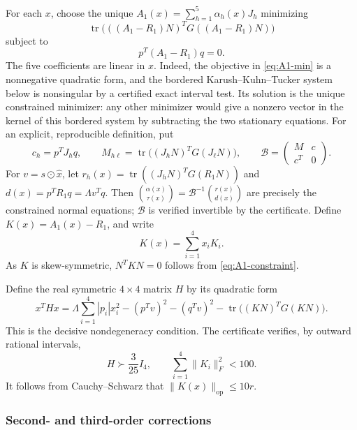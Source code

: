\documentclass[11pt]{article}
\newcommand{\tr}{\operatorname{tr}}
\newcommand{\Op}{\mathrm{op}}
\begin{document}
For each $x$, choose the unique $A_1(x)=\sum_{h=1}^5\alpha_h(x)J_h$ minimizing
\begin{equation}\label{eq:A1-min}
 \tr\bigl(((A_1-R_1)N)^TG((A_1-R_1)N)\bigr)
\end{equation}
subject to
\begin{equation}\label{eq:A1-constraint}
 p^T(A_1-R_1)q=0.
\end{equation}
The five coefficients are linear in $x$. Indeed, the objective in
\eqref{eq:A1-min} is a nonnegative quadratic form, and the bordered
Karush--Kuhn--Tucker system below is nonsingular by a certified exact
interval test. Its solution is the unique constrained minimizer: any other
minimizer would give a nonzero vector in the kernel of this bordered system
by subtracting the two stationary equations. For an explicit, reproducible
definition, put
\begin{equation}\label{eq:M-c}
 c_h=p^TJ_hq,\qquad
 M_{h\ell}=\tr\bigl((J_hN)^TG(J_\ell N)\bigr),\qquad
 \mathcal B=\begin{pmatrix}M&c\\c^T&0\end{pmatrix}.
\end{equation}
For $v=s\odot\widehat x$, let $r_h(x)=\tr((J_hN)^TG(R_1N))$ and $d(x)=p^TR_1q=\Lambda v^Tq$. Then $\binom{\alpha(x)}{\tau(x)}=\mathcal B^{-1}\binom{r(x)}{d(x)}$ are precisely the constrained normal equations; $\mathcal B$ is verified invertible by the certificate. Define $K(x)=A_1(x)-R_1$, and write
\begin{equation}\label{eq:Ki}
 K(x)=\sum_{i=1}^4x_iK_i.
\end{equation}
As $K$ is skew-symmetric, $N^TKN=0$ follows from \eqref{eq:A1-constraint}.

Define the real symmetric $4\times4$ matrix $H$ by its quadratic form
\begin{equation}\label{eq:H}
 x^THx=\Lambda\sum_{i=1}^4|p_i|x_i^2
 -(p^Tv)^2-(q^Tv)^2
 -\tr\bigl((KN)^TG(KN)\bigr).
\end{equation}
This is the decisive nondegeneracy condition. The certificate verifies, by outward rational intervals,
\begin{equation}\label{eq:first-checked}
 H\succ\frac3{25}I_4,\qquad \sum_{i=1}^4\|K_i\|_F^2<100.
\end{equation}
It follows from Cauchy--Schwarz that $\|K(x)\|_\Op\le10r$.

\subsubsection{Second- and third-order corrections}
\end{document}
